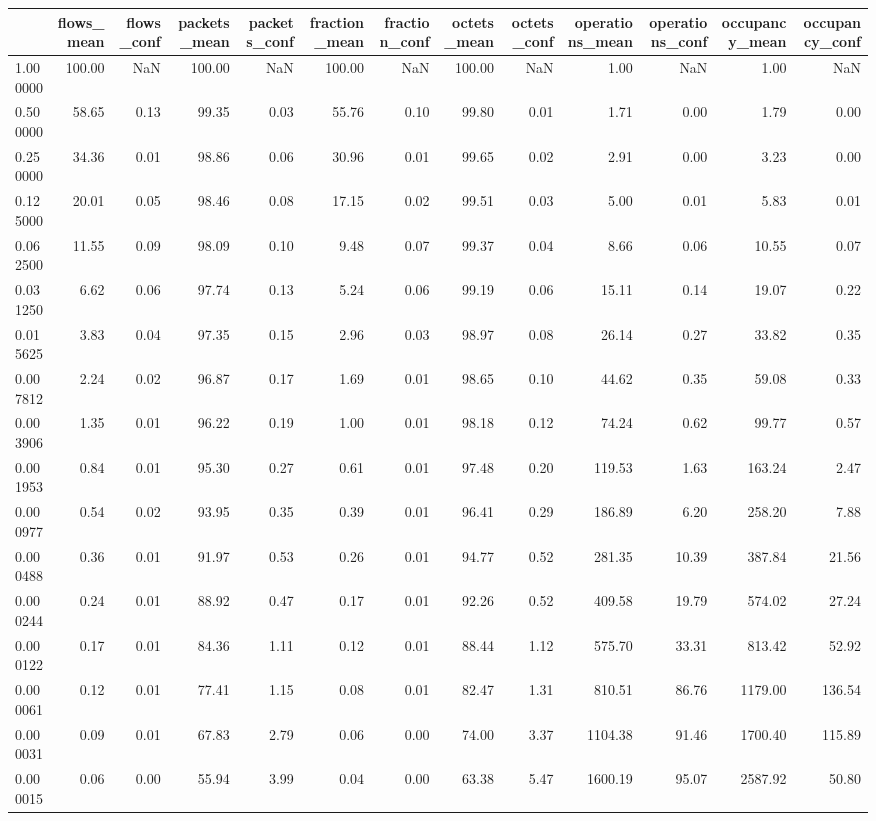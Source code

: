\begin{tabular}{lrrrrrrrrrrrr}
\toprule
 & flows_mean & flows_conf & packets_mean & packets_conf & fraction_mean & fraction_conf & octets_mean & octets_conf & operations_mean & operations_conf & occupancy_mean & occupancy_conf \\
\midrule
1.000000 & 100.00 & NaN & 100.00 & NaN & 100.00 & NaN & 100.00 & NaN & 1.00 & NaN & 1.00 & NaN \\
0.500000 & 58.65 & 0.13 & 99.35 & 0.03 & 55.76 & 0.10 & 99.80 & 0.01 & 1.71 & 0.00 & 1.79 & 0.00 \\
0.250000 & 34.36 & 0.01 & 98.86 & 0.06 & 30.96 & 0.01 & 99.65 & 0.02 & 2.91 & 0.00 & 3.23 & 0.00 \\
0.125000 & 20.01 & 0.05 & 98.46 & 0.08 & 17.15 & 0.02 & 99.51 & 0.03 & 5.00 & 0.01 & 5.83 & 0.01 \\
0.062500 & 11.55 & 0.09 & 98.09 & 0.10 & 9.48 & 0.07 & 99.37 & 0.04 & 8.66 & 0.06 & 10.55 & 0.07 \\
0.031250 & 6.62 & 0.06 & 97.74 & 0.13 & 5.24 & 0.06 & 99.19 & 0.06 & 15.11 & 0.14 & 19.07 & 0.22 \\
0.015625 & 3.83 & 0.04 & 97.35 & 0.15 & 2.96 & 0.03 & 98.97 & 0.08 & 26.14 & 0.27 & 33.82 & 0.35 \\
0.007812 & 2.24 & 0.02 & 96.87 & 0.17 & 1.69 & 0.01 & 98.65 & 0.10 & 44.62 & 0.35 & 59.08 & 0.33 \\
0.003906 & 1.35 & 0.01 & 96.22 & 0.19 & 1.00 & 0.01 & 98.18 & 0.12 & 74.24 & 0.62 & 99.77 & 0.57 \\
0.001953 & 0.84 & 0.01 & 95.30 & 0.27 & 0.61 & 0.01 & 97.48 & 0.20 & 119.53 & 1.63 & 163.24 & 2.47 \\
0.000977 & 0.54 & 0.02 & 93.95 & 0.35 & 0.39 & 0.01 & 96.41 & 0.29 & 186.89 & 6.20 & 258.20 & 7.88 \\
0.000488 & 0.36 & 0.01 & 91.97 & 0.53 & 0.26 & 0.01 & 94.77 & 0.52 & 281.35 & 10.39 & 387.84 & 21.56 \\
0.000244 & 0.24 & 0.01 & 88.92 & 0.47 & 0.17 & 0.01 & 92.26 & 0.52 & 409.58 & 19.79 & 574.02 & 27.24 \\
0.000122 & 0.17 & 0.01 & 84.36 & 1.11 & 0.12 & 0.01 & 88.44 & 1.12 & 575.70 & 33.31 & 813.42 & 52.92 \\
0.000061 & 0.12 & 0.01 & 77.41 & 1.15 & 0.08 & 0.01 & 82.47 & 1.31 & 810.51 & 86.76 & 1179.00 & 136.54 \\
0.000031 & 0.09 & 0.01 & 67.83 & 2.79 & 0.06 & 0.00 & 74.00 & 3.37 & 1104.38 & 91.46 & 1700.40 & 115.89 \\
0.000015 & 0.06 & 0.00 & 55.94 & 3.99 & 0.04 & 0.00 & 63.38 & 5.47 & 1600.19 & 95.07 & 2587.92 & 50.80 \\

\end{tabular}

